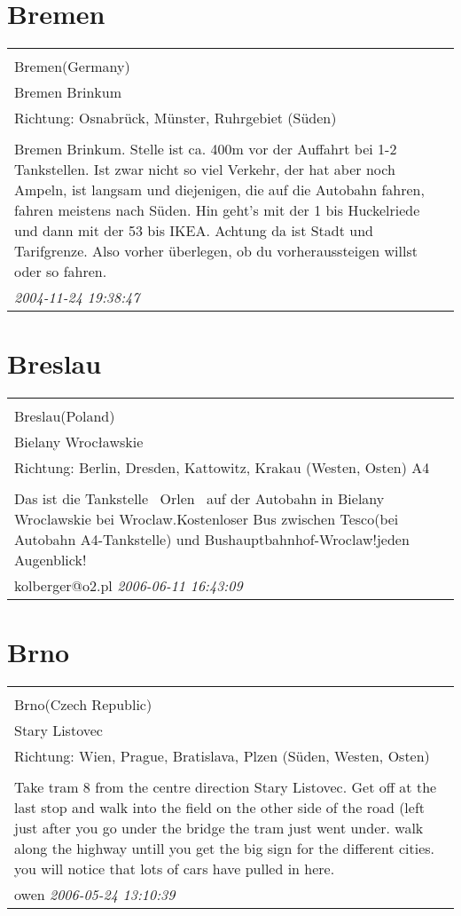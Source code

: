 \documentclass[a4paper,12pt]{article}
\begin{document}
\section{Bremen}
\begin{tabular}{|p{13cm}|}
\hline\\
Bremen(Germany)\\
Bremen Brinkum\\
Richtung: Osnabrück, Münster, Ruhrgebiet (Süden) \\
\hline\\
Bremen Brinkum. Stelle ist ca. 400m vor der Auffahrt bei 1-2 Tankstellen. Ist zwar nicht so viel Verkehr, der hat aber noch Ampeln, ist langsam und diejenigen, die auf die Autobahn fahren, fahren meistens nach Süden. Hin geht's mit der 1 bis Huckelriede und dann mit der 53 bis IKEA. Achtung da ist Stadt und Tarifgrenze. Also vorher überlegen, ob du vorheraussteigen willst oder so fahren. \\
\textit{ 2004-11-24 19:38:47 }\\\hline
\end{tabular}


\section{Breslau}
\begin{tabular}{|p{13cm}|}
\hline\\
Breslau(Poland)\\
Bielany Wrocławskie\\
Richtung: Berlin, Dresden, Kattowitz, Krakau (Westen, Osten) A4 \\
\hline\\
Das ist die Tankstelle \ Orlen \ auf der Autobahn in Bielany Wroclawskie bei Wroclaw.Kostenloser Bus zwischen Tesco(bei Autobahn A4-Tankstelle) und Bushauptbahnhof-Wroclaw!jeden Augenblick! \\
kolberger@o2.pl \textit{ 2006-06-11 16:43:09 }\\\hline
\end{tabular}


\section{Brno}
\begin{tabular}{|p{13cm}|}
\hline\\
Brno(Czech Republic)\\
Stary Listovec\\
Richtung: Wien, Prague, Bratislava, Plzen (Süden, Westen, Osten) \\
\hline\\
Take tram 8 from the centre direction Stary Listovec. Get off at the last stop and walk into the field on the other side of the road (left just after you go under the bridge the tram just went under. walk along the highway untill you get the big sign for the different cities. you will notice that lots of cars have pulled in here. \\
owen \textit{ 2006-05-24 13:10:39 }\\\hline
\end{tabular}
\end{document}
